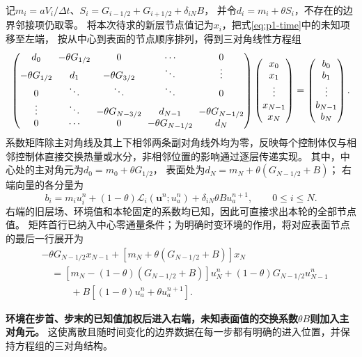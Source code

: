 记$m_i=aV_i/\Delta t$、$S_i=G_{i-1/2}+G_{i+1/2}+\delta_{iN}B$，
并令$d_i=m_i+\theta S_i$，不存在的边界邻接项仍取零。
将本次待求的新层节点值记为$x_i$，把式\eqref{eq:p1-time}中的未知项移至左端，
按从中心到表面的节点顺序排列，得到三对角线性方程组
\begin{equation}
\setlength{\arraycolsep}{3pt}
\begin{pmatrix}
  d_0 & -\theta G_{1/2} & 0 & \cdots & 0\\
  -\theta G_{1/2} & d_1 & -\theta G_{3/2} & \ddots & \vdots\\
  0 & \ddots & \ddots & \ddots & 0\\
  \vdots & \ddots & -\theta G_{N-3/2} & d_{N-1} & -\theta G_{N-1/2}\\
  0 & \cdots & 0 & -\theta G_{N-1/2} & d_N
\end{pmatrix}
\begin{pmatrix}
  x_0\\x_1\\\vdots\\x_{N-1}\\x_N
\end{pmatrix}
=
\begin{pmatrix}
  b_0\\b_1\\\vdots\\b_{N-1}\\b_N
\end{pmatrix}.
\label{eq:p1-linear-system}
\end{equation}
系数矩阵除主对角线及其上下相邻两条副对角线外均为零，反映每个控制体仅与相邻控制体直接交换热量或水分，非相邻位置的影响通过逐层传递实现。
其中，中心处的主对角元为$d_0=m_0+\theta G_{1/2}$，
表面处为$d_N=m_N+\theta(G_{N-1/2}+B)$；
右端向量的各分量为
\begin{equation*}
  b_i=m_i u_i^n+(1-\theta)\mathcal L_i(\boldsymbol u^n;u_a^n)
       +\delta_{iN}\theta B u_a^{n+1},\qquad 0\le i\le N.
\end{equation*}
右端的旧层场、环境值和本轮固定的系数均已知，因此可直接求出本轮的全部节点值。
矩阵首行已纳入中心零通量条件；为明确时变环境的作用，将对应表面节点的最后一行展开为
\begin{equation}
\begin{aligned}
  &-\theta G_{N-1/2}x_{N-1}
    +[m_N+\theta(G_{N-1/2}+B)]x_N\\
  &\quad=[m_N-(1-\theta)(G_{N-1/2}+B)]u_N^n
    +(1-\theta)G_{N-1/2}u_{N-1}^n\\
  &\qquad\quad+B[(1-\theta)u_a^n+\theta u_a^{n+1}].
\end{aligned}
\label{eq:p1-surface-row}
\end{equation}
\begin{samepage}
\textbf{环境在步首、步末的已知值加权后进入右端，未知表面值的交换系数$\theta B$则加入主对角元。}
这使离散且随时间变化的边界数据在每一步都有明确的进入位置，并保持方程组的三对角结构。
\par\end{samepage}

